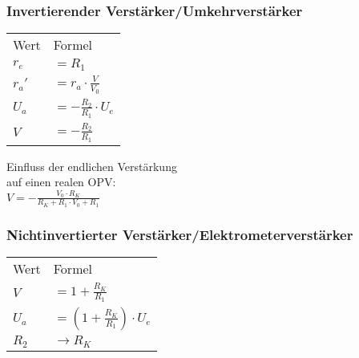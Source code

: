     \subsubsection{Invertierender Verstärker/Umkehrverstärker}
    \begin{minipage}{0.6\columnwidth}
        \renewcommand{\arraystretch}{1.05}
        \begin{table}[H]
            \begin{tabularx}{\columnwidth}{l l}
                Wert & Formel \\
                $r_e$ & $=R_1$ \\
                $r_a'$ & $=r_a\cdot\frac{V}{V_0}$\\
                $U_a$ & $=-\frac{R_2}{R_1}\cdot U_e$ \\
                $V$ & $=-\frac{R_2}{R_1}$ \\
            \end{tabularx}
        \end{table}
        Einfluss der endlichen Verstärkung\\auf einen realen OPV:\\
        $V=-\frac{V_0\cdot R_K}{R_K+R_1\cdot V_0+R_1}$
    \end{minipage}
    \begin{minipage}{0.4\columnwidth}
    \end{minipage}
    \subsubsection{Nichtinvertierter Verstärker/Elektrometerverstärker}
    \begin{minipage}{0.6\columnwidth}
        \renewcommand{\arraystretch}{1.1}
        \begin{table}[H]
            \begin{tabularx}{\columnwidth}{l l}
               Wert & Formel \\
               $V$ & $=1+\frac{R_K}{R_1}$ \\
               $U_a$ & $=(1+\frac{R_K}{R_1})\cdot U_e$ \\
               $R_2$ & $\longrightarrow R_K$
            \end{tabularx}
        \end{table}
    \end{minipage}
    \begin{minipage}{0.4\columnwidth}
    \end{minipage}
